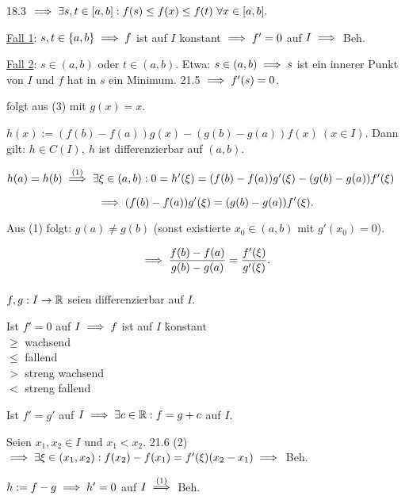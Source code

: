 \documentclass[a4paper,twoside,DIV15,BCOR12mm]{scrbook}
\begin{document}
\begin{beweise}
\item 18.3 $\implies \exists s,t \in  [a,b]: f(s) \le f(x) \le f(t)\ \forall x \in [a,b].$

\underline{Fall 1}: $s,t \in \{a,b\} \implies f$ ist auf $I$ konstant $\implies f' = 0$ auf $I \implies$ Beh.

\underline{Fall 2}: $s \in (a,b)$ oder $t \in (a,b)$. Etwa: $s \in (a,b) \implies s$ ist ein innerer Punkt von $I$ und $f$ hat in $s$ ein Minimum. 21.5 $\implies f'(s) = 0$.
\item folgt aus (3) mit $g(x) = x$.
\item $h(x) := (f(b)-f(a))g(x) - (g(b)-g(a))f(x)\ (x \in I)$. Dann gilt: $h \in C(I),\ h$ ist differenzierbar auf $(a,b)$.

$h(a) = h(b) \overset{\text{(1)}}{\implies} \exists \xi \in (a,b): 0 = h'(\xi) = (f(b)-f(a))g'(\xi) - (g(b)-g(a))f'(\xi)$

$$\implies (f(b)-f(a))g'(\xi) = (g(b)-g(a))f'(\xi).$$

Aus (1) folgt: $g(a) \ne g(b)$ (sonst existierte $x_0 \in (a,b)$ mit $g'(x_0) = 0$).

$$\implies \frac{f(b)-f(a)}{g(b)-g(a)} = \frac{f'(\xi)}{g'(\xi)}.$$
$ $
\end{beweise}

\begin{folgerungen}

$f,g: I \to \mathbb{R}$ seien differenzierbar auf $I$.
\begin{liste}
\item \begin{tabbing}
Ist $f' $\=$= 0$ auf $I \implies f$ ist auf $I$ \=konstant\\
\>$\geq$ \>wachsend\\
\>$\leq$ \>fallend\\
\>$>$    \>streng wachsend\\
\>$<$    \>streng fallend\\
\end{tabbing}

\item Ist $f' = g'$ auf $I \implies \exists c \in \mathbb{R}: f=g+c$ auf $I$.
\end{liste}
\end{folgerungen}

\begin{beweise}
\item Seien $x_1,x_2 \in I$ und $x_1<x_2$. 21.6 (2) $\implies \exists \xi \in (x_1,x_2): f(x_2)-f(x_1) = f'(\xi)(x_2-x_1) \implies$ Beh.
\item $h := f-g \implies h' = 0$ auf $I \overset{(1)}{\implies}$ Beh.
\end{beweise}
\end{document}
